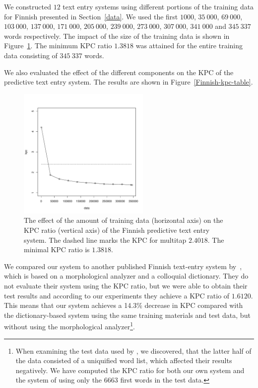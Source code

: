 \documentclass{llncs}
\begin{document}
We constructed $12$ text entry systems using different portions of the
training data for Finnish presented in Section~\ref{data}. We used the
first $1000$, $35\ 000$, $69\ 000$, $103\ 000$, $137\ 000$, $171\ 000$,
$205\ 000$, $239\ 000$, $273\ 000$, $307\ 000$, $341\ 000$ and $345\ 337$ words
respectively. The impact of the size of the training data is shown in
Figure~\ref{fi-kpc-graph}. The minimum KPC ratio $1.3818$ was attained
for the entire training data consisting of $345\ 337$ words.

We also evaluated the effect of the different components on the KPC of
the predictive text entry system. The results are shown in
Figure~\ref{Finnish-kpc-table}.

\begin{figure}[hbt!]
\begin{center}
\includegraphics[width=2.5in]{finnish_kpc_figure.pdf}
\end{center}
\caption{The effect of the amount of training data (horizontal axis)
  on the KPC ratio (vertical axis) of the Finnish predictive text
  entry system. The dashed line marks the KPC for
  multitap $2.4018$. The minimal KPC ratio is $1.3818$.}\label{fi-kpc-graph}
\end{figure}

We compared our system to another published Finnish text-entry system
by~\cite{silfverberg/2011/cla}, which is based on a morphological
analyzer and a colloquial dictionary. They do not evaluate their
system using the KPC ratio, but we were able to obtain their test
results and according to our experiments they achieve a KPC ratio of
$1.6120$. This means that our system achieves a 14.3\% decrease in KPC
compared with the dictionary-based system using the same training
materials and test data, but without using the morphological
analyzer\footnote{When examining the test data used by
  \cite{silfverberg/2011/cla}, we discovered, that the latter half of
  the data consisted of a uniquified word list, which affected their
  results negatively. We have computed the KPC ratio for both our own
  system and the system of \cite{silfverberg/2011/cla} using only the
  $6663$ first words in the test data.}.
\end{document}
